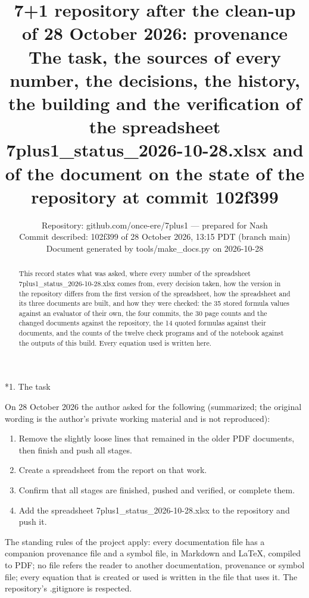 \documentclass[10pt,a4paper]{article}
\makeatletter
\renewcommand\section{\@startsection{section}{1}{\z@}{-3.5ex \@plus -1ex \@minus -.2ex}{2.3ex \@plus.2ex}{\normalfont\Large\bfseries\raggedright}}
\makeatother
\begin{document}
\title{7+1 repository after the clean-up of 28 October 2026: provenance\\[0.4em]\large The task, the sources of every number, the decisions, the history, the building and the verification of the spreadsheet 7plus1\_status\_2026-10-28.xlsx and of the document on the state of the repository at commit 102f399}
\author{Repository: github.com/once-ere/7plus1 — prepared for Nash\\ Commit described: 102f399 of 28 October 2026, 13:15 PDT (branch main)\\ Document generated by tools/make\_docs.py on 2026-10-28}
\date{}
\maketitle
\begin{abstract}
This record states what was asked, where every number of the spreadsheet 7plus1\_status\_2026-10-28.xlsx comes from, every decision taken, how the version in the repository differs from the first version of the spreadsheet, how the spreadsheet and its three documents are built, and how they were checked: the 35 stored formula values against an evaluator of their own, the four commits, the 30 page counts and the changed documents against the repository, the 14 quoted formulas against their documents, and the counts of the twelve check programs and of the notebook against the outputs of this build. Every equation used is written here.
\end{abstract}
\tableofcontents
{}\section*{1. The task}
On 28 October 2026 the author asked for the following (summarized; the original wording is the author’s private working material and is not reproduced):

\begin{enumerate}
\item Remove the slightly loose lines that remained in the older PDF documents, then finish and push all stages.
\item Create a spreadsheet from the report on that work.
\item Confirm that all stages are finished, pushed and verified, or complete them.
\item Add the spreadsheet 7plus1\_status\_2026-10-28.xlsx to the repository and push it.
\end{enumerate}
The standing rules of the project apply: every documentation file has a companion provenance file and a symbol file, in Markdown and LaTeX, compiled to PDF; no file refers the reader to another documentation, provenance or symbol file; every equation that is created or used is written in the file that uses it. The repository’s .gitignore is respected.
\end{document}
